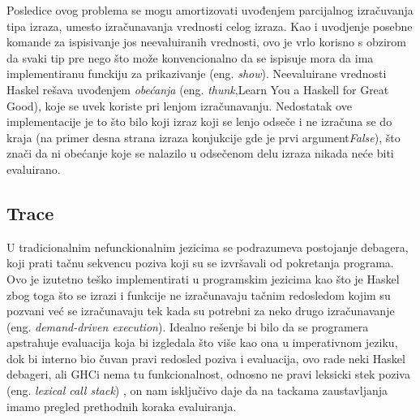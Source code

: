 \documentclass[a4paper]{article}
\begin{document}
{{Posledice ovog problema se mogu amortizovati uvođenjem parcijalnog izračuvanja tipa izraza, umesto izračunavanja vrednosti celog izraza. Kao i uvodjenje posebne komande za ispisivanje jos neevaluiranih vrednosti, ovo je vrlo korisno s obzirom da svaki tip pre nego što može konvencionalno da se ispisuje mora da ima implementiranu funckiju za prikazivanje (eng. {\em show}). Neevaluirane vrednosti Haskel rešava uvođenjem {\em obećanja} (eng. {\em thunk},Learn You a Haskell for Great Good), koje se uvek koriste pri lenjom izračunavanju. Nedostatak ove implementacije je to što bilo koji izraz koji se lenjo odseče i ne izračuna se do kraja (na primer desna strana izraza konjukcije gde je prvi argument{\em False}), što znači da ni obećanje koje se nalazilo u odsečenom delu izraza nikada neće biti evaluirano. 


\subsection{Trace}

U tradicionalnim nefunckionalnim jezicima se podrazumeva postojanje debagera, koji prati tačnu sekvencu poziva koji su se izvršavali od pokretanja programa. Ovo je izutetno teško implementirati u programskim jezicima kao što je Haskel zbog toga što se izrazi i funkcije ne izračunavaju tačnim redosledom kojim su pozvani već se izračunavaju tek kada su potrebni za neko drugo izračunavanje (eng. {\em demand-driven execution}). Idealno rešenje bi bilo da se programera apstrahuje evaluacija koja bi izgledala što više kao ona u imperativnom jeziku, dok bi interno bio čuvan pravi redosled poziva i evaluacija, ovo rade neki Haskel debageri, ali GHCi nema tu funkcionalnost, odnosno ne pravi leksicki stek poziva (eng. {\em lexical call stack}) , on nam isključivo daje da na tackama zaustavljanja imamo pregled prethodnih koraka evaluiranja.


}}
\end{document}
